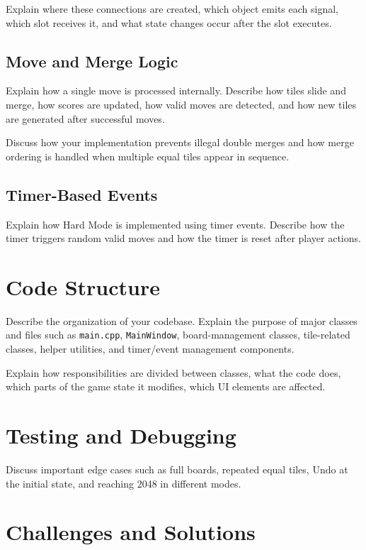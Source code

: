 \documentclass[a4paper,12pt]{article}
\begin{document}
Explain where these connections are created, which object emits each signal, which slot receives it, and what state changes occur after the slot executes.

\subsection{Move and Merge Logic}

Explain how a single move is processed internally. Describe how tiles slide and merge, how scores are updated, how valid moves are detected, and how new tiles are generated after successful moves.

Discuss how your implementation prevents illegal double merges and how merge ordering is handled when multiple equal tiles appear in sequence.

\subsection{Timer-Based Events}

Explain how Hard Mode is implemented using timer events. Describe how the timer triggers random valid moves and how the timer is reset after player actions.

\section{Code Structure}

Describe the organization of your codebase. Explain the purpose of major classes and files such as \texttt{main.cpp}, \texttt{MainWindow}, board-management classes, tile-related classes, helper utilities, and timer/event management components.

Explain how responsibilities are divided between classes, what the code does, which parts of the game state it modifies, which UI elements are affected.

\section{Testing and Debugging}

Discuss important edge cases such as full boards, repeated equal tiles, Undo at the initial state, and reaching 2048 in different modes.

\section{Challenges and Solutions}
\end{document}
